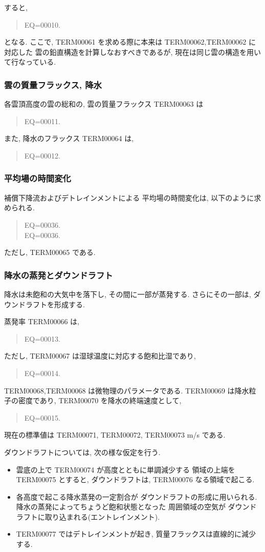 すると,
\begin{quote}
EQ=00010.
\end{quote}
となる.
ここで, TERM00061 を求める際に本来は TERM00062,TERM00062 に対応した
雲の鉛直構造を計算しなおすべきであるが, 
現在は同じ雲の構造を用いて行なっている.

\subsubsection{雲の質量フラックス, 降水}

各雲頂高度の雲の総和の, 
雲の質量フラックス TERM00063 は
\begin{quote}
EQ=00011.
\end{quote}

また, 降水のフラックス TERM00064 は,
\begin{quote}
EQ=00012.
\end{quote}

\subsubsection{平均場の時間変化}

補償下降流およびデトレインメントによる
平均場の時間変化は, 以下のように求められる.
\begin{quote}
EQ=00036.\\
EQ=00036.
\end{quote}
ただし, TERM00065 である.

\subsubsection{降水の蒸発とダウンドラフト}

降水は未飽和の大気中を落下し, その間に一部が蒸発する.
さらにその一部は, ダウンドラフトを形成する.

蒸発率 TERM00066 は,
\begin{quote}
EQ=00013.
\end{quote}
ただし, TERM00067 は湿球温度に対応する飽和比湿であり,
\begin{quote}
EQ=00014.
\end{quote}
TERM00068,TERM00068 は微物理のパラメータである.
TERM00069 は降水粒子の密度であり, TERM00070 を降水の終端速度として,
\begin{quote}
EQ=00015.
\end{quote}
現在の標準値は TERM00071, TERM00072, TERM00073 m/s である.

ダウンドラフトについては, 次の様な仮定を行う.
\begin{itemize}
\item 雲底の上で TERM00074 が高度とともに単調減少する
      領域の上端を TERM00075 とすると, ダウンドラフトは,
      TERM00076 なる領域で起こる.
\item 各高度で起こる降水蒸発の一定割合が
      ダウンドラフトの形成に用いられる.
      降水の蒸発によってちょうど飽和状態となった
      周囲領域の空気が
      ダウンドラフトに取り込まれる(エントレインメント).
\item TERM00077 ではデトレインメントが起き,
      質量フラックスは直線的に減少する.
\end{itemize}

